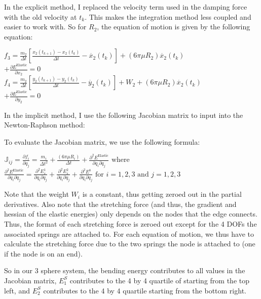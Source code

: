 \documentclass[letterpaper, 10 pt, conference]{ieeeconf}  %
\begin{document}
In the explicit method, I replaced the velocity term used in the damping force with the old velocity at $t_k$. This makes the integration method less coupled and easier to work with. So for $R_2$, the equation of motion is given by the following equation:
\begin{center}
$f_3 = \frac{m_2}{\Delta t} \left[\frac{x_2(t_{k+1}) - x_2(t_k)}{\Delta t} - \dot{x_2}(t_k)\right] + (6 \pi \mu R_2)\dot{x_2}(t_k)  $\\$ + \frac{\partial E^{\text{Elastic}}}{\partial x_2} = 0$ \\
$f_4 = \frac{m_2}{\Delta t} \left[\frac{y_2(t_{k+1}) - y_2(t_k)}{\Delta t} - \dot{y_2}(t_k)\right] + W_2 + (6 \pi \mu R_2)\dot{x_2}(t_k) $\\$ + \frac{\partial E^{\text{Elastic}}}{\partial y_2} = 0$ \\

\end{center}


In the implicit method, I use the following Jacobian matrix to input into the Newton-Raphson method:

To evaluate the Jacobian matrix, we use the following formula:

\begin{center}

        $ \mathbb{J}_{ij} = \frac{\partial f_i}{ \partial q_j} = \frac{m_i}{\Delta t^2} + \frac{(6 \pi \mu R_i)}{\Delta t} + \frac{\partial^2 E^{\text{Elastic}}}{\partial q_i \partial q_j }$ 
        $\text{where}$ \\

        $\frac{\partial^2 E^{\text{Elastic}}}{\partial q_i \partial q_j} = \frac{\partial^2 E^1_s}{\partial q_i \partial q_j} + \frac{\partial^2 E^2_s}{\partial q_i \partial q_j} + \frac{\partial^2 E^b}{\partial q_i \partial q_j} \text{  for  } i = 1, 2, 3 \text{  and  } j = 1, 2, 3$
        
\end{center}
Note that the weight $W_i$ is a constant, thus getting zeroed out in the partial derivatives. Also note that the stretching force (and thus, the gradient and hessian of the elastic energies) only depends on the nodes that the edge connects. Thus, the format of each stretching force is zeroed out except for the 4 DOFs the associated springs are attached to. For each equation of motion, we thus have to calculate the stretching force due to the two springs the node is attached to (one if the node is on an end).

So in our 3 sphere system, the bending energy contributes to all values in the Jacobian matrix, $E^S_1$ contributes to the 4 by 4 quartile of starting from the top left, and $E^S_2$ contributes to the 4 by 4 quartile starting from the bottom right.
\end{document}
